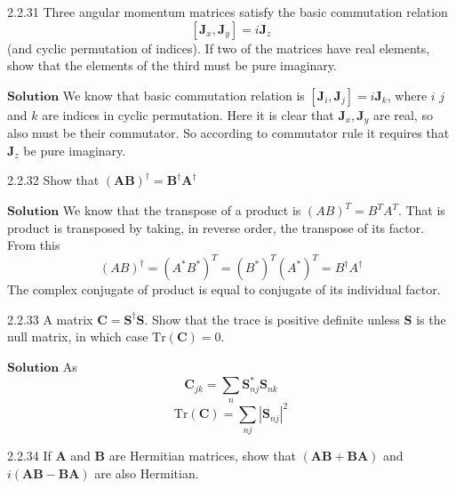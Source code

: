\documentclass{article}
\begin{document}
\begin{flushleft}
\newpage

\begin{mybox}{2.2.31}
Three angular momentum matrices satisfy the basic commutation relation
$$[\mathbf{J}_x, \mathbf{J}_y] = i\mathbf{J}_z$$
(and cyclic permutation of indices). If two of the matrices have real elements, show that
the elements of the third must be pure imaginary.
\end{mybox}

$\boxed{\textbf{Solution}}$ We know that basic commutation relation is $\left[\mathbf{J}_{i}, \mathbf{J}_{j}\right]=i \mathbf{J}_{k}$, where $i$ $j$ and $k$ are indices in cyclic permutation.
Here it is clear that $\mathbf{J}_{x}, \mathbf{J}_{y}$ are real, so also must be their commutator. So according to
commutator rule it requires that $\mathbf{J}_{z}$ be pure imaginary.


\newpage


\begin{mybox}{2.2.32}
Show that $(\mathbf{A}\mathbf{B})^{\dagger}=\mathbf{B}^{\dagger} \mathbf{A}^{\dagger}$
\end{mybox}



$\boxed{\textbf{Solution}}$ We know that the transpose of a product is $(A B)^{T}=B^{T} A^{T}$. That is product is transposed by
taking, in reverse order, the transpose of its factor.
From this
$$
(A B)^{\dagger}=\left(A^{*} B^{*}\right)^{T}=\left(B^{*}\right)^{T}\left(A^{*}\right)^{T}=B^{\dagger} A^{\dagger}
$$
The complex conjugate of product is equal to conjugate of its individual factor.

\newpage


\begin{mybox}{2.2.33}
A matrix $\mathbf{C}=\mathbf{S}^{\dagger} \mathbf{S}$. Show that the trace is positive definite unless $\mathbf{S}$ is the null matrix, in which case $\text{Tr}(\mathbf{C})=0 .$
\end{mybox}



$\boxed{\textbf{Solution}}$ As
$$\mathbf{C}_{j k}=\sum_{n} \boldsymbol{S}_{n j}^{*} \boldsymbol{S}_{n k}$$
$$\text{Tr}(\mathbf{C})=\sum_{n j}\left|\boldsymbol{S}_{n j}\right|^{2}$$


\newpage

\begin{mybox}{2.2.34}
If $\mathbf{A}$ and $\mathbf{B}$ are Hermitian matrices, show that $(\mathbf{A}\mathbf{B}+\mathbf{BA})$ and $i(\mathbf{A}\mathbf{B}-\mathbf{B}\mathbf{A})$ are also Hermitian.
\end{mybox}


\end{flushleft}
\end{document}
